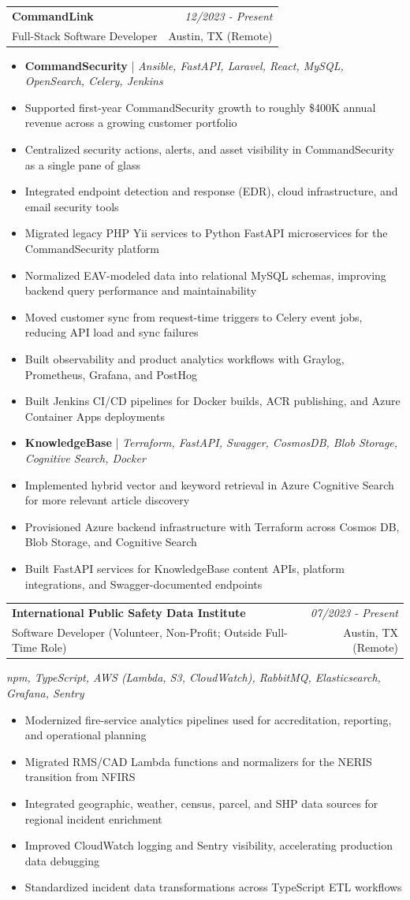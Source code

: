 \documentclass[a4paper,11pt]{article}
\makeatletter
\newcommand{\resumeExperience}[5]{
  \vspace{1mm}\item
    \begin{tabular*}{0.98\textwidth}[t]{l@{\extracolsep{\fill}}r}
        \textbf{#1} & \textit{\footnotesize{#4}} \\
        {\footnotesize{#3}} & \footnotesize{#2}
    \end{tabular*}
    \vspace{1mm}
    \parbox{0.98\textwidth}{\footnotesize #5}
    \vspace{-4.2mm}
}
\newcommand{\resumeProjectSubheader}[2]{
  \item[] {\hspace*{-3ex}\textbf{#1} | \textit{#2}}
}
\newcommand{\resumeItemListStart}{\begin{justify}\begin{itemize}[leftmargin=3ex, rightmargin=2ex, noitemsep,labelsep=1.2mm,itemsep=1.2mm]\footnotesize}
\newcommand{\resumeItemListEnd}{\end{itemize}\end{justify}\vspace{-5.2mm}}
\makeatother
\begin{document}
  \resumeExperience
    {CommandLink}{Austin, TX (Remote)}
    {Full-Stack Software Developer}{12/2023 - Present}
    {}
    \vspace{1.0mm}
    \resumeItemListStart
      \resumeProjectSubheader{CommandSecurity}{Ansible, FastAPI, Laravel, React, MySQL, OpenSearch, Celery, Jenkins}
      \item {Supported first-year CommandSecurity growth to roughly \$400K annual revenue across a growing customer portfolio}
      \item {Centralized security actions, alerts, and asset visibility in CommandSecurity as a single pane of glass}
      \item {Integrated endpoint detection and response (EDR), cloud infrastructure, and email security tools}
      \item {Migrated legacy PHP Yii services to Python FastAPI microservices for the CommandSecurity platform}
      \item {Normalized EAV-modeled data into relational MySQL schemas, improving backend query performance and maintainability}
      \item {Moved customer sync from request-time triggers to Celery event jobs, reducing API load and sync failures}
      \item {Built observability and product analytics workflows with Graylog, Prometheus, Grafana, and PostHog}
      \item {Built Jenkins CI/CD pipelines for Docker builds, ACR publishing, and Azure Container Apps deployments}
      \resumeProjectSubheader{KnowledgeBase}{Terraform, FastAPI, Swagger, CosmosDB, Blob Storage, Cognitive Search, Docker}
      \item {Implemented hybrid vector and keyword retrieval in Azure Cognitive Search for more relevant article discovery}
      \item {Provisioned Azure backend infrastructure with Terraform across Cosmos DB, Blob Storage, and Cognitive Search}
      \item {Built FastAPI services for KnowledgeBase content APIs, platform integrations, and Swagger-documented endpoints}
    \resumeItemListEnd

  \resumeExperience
    {International Public Safety Data Institute}{Austin, TX (Remote)}
    {Software Developer (Volunteer, Non-Profit; Outside Full-Time Role)}{07/2023 - Present}
    {\textit{npm, TypeScript, AWS (Lambda, S3, CloudWatch), RabbitMQ, Elasticsearch, Grafana, Sentry}}
    \resumeItemListStart
      \item {Modernized fire-service analytics pipelines used for accreditation, reporting, and operational planning}
      \item {Migrated RMS/CAD Lambda functions and normalizers for the NERIS transition from NFIRS}
      \item {Integrated geographic, weather, census, parcel, and SHP data sources for regional incident enrichment}
      \item {Improved CloudWatch logging and Sentry visibility, accelerating production data debugging}
      \item {Standardized incident data transformations across TypeScript ETL workflows}
    \resumeItemListEnd
\end{document}
